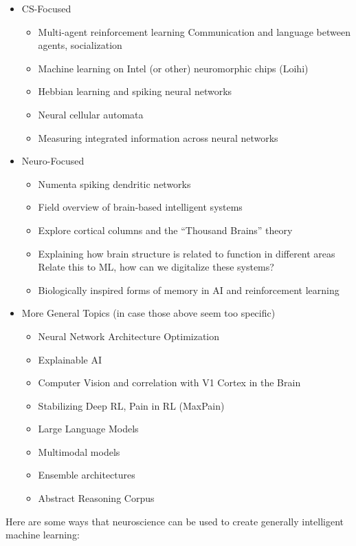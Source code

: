 \documentclass[letterpaper,11pt]{article}
\begin{document}
\begin{itemize}
\item CS-Focused
    \begin{itemize}
        \item Multi-agent reinforcement learning
            Communication and language between agents, socialization
    
        \item Machine learning on Intel (or other) neuromorphic chips (Loihi)
    
        \item Hebbian learning and spiking neural networks
    
        \item Neural cellular automata
    
        \item Measuring integrated information across neural networks
    \end{itemize}

\item Neuro-Focused
    \begin{itemize}
        \item Numenta spiking dendritic networks
    
        \item Field overview of brain-based intelligent systems
    
        \item Explore cortical columns and the “Thousand Brains” theory
    
        \item Explaining how brain structure is related to function in different areas
            Relate this to ML, how can we digitalize these systems?
        \item Biologically inspired forms of memory in AI and reinforcement learning
    \end{itemize}

\item More General Topics (in case those above seem too specific)
    \begin{itemize}
        \item Neural Network Architecture Optimization

        \item Explainable AI

        \item Computer Vision and correlation with V1 Cortex in the Brain

        \item Stabilizing Deep RL, Pain in RL (MaxPain)

        \item Large Language Models

        \item Multimodal models

        \item Ensemble architectures

        \item Abstract Reasoning Corpus
    \end{itemize}
\end{itemize}
Here are some ways that neuroscience can be used to create generally intelligent machine learning:
\end{document}
